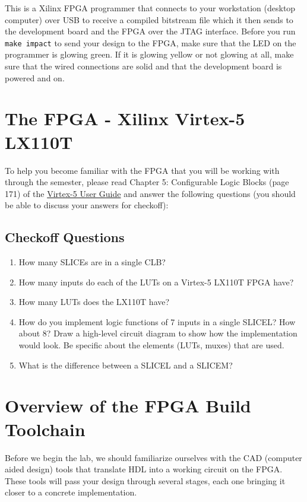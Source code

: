 \documentclass[11pt]{article}
\begin{document}
This is a Xilinx FPGA programmer that connects to your workstation (desktop computer) over USB to receive a compiled bitstream file which it then sends to the development board and the FPGA over the JTAG interface. Before you run \verb|make impact| to send your design to the FPGA, make sure that the LED on the programmer is glowing green. If it is glowing yellow or not glowing at all, make sure that the wired connections are solid and that the development board is powered and on.

\section{The FPGA - Xilinx Virtex-5 LX110T}
To help you become familiar with the FPGA that you will be working with through the semester, please read Chapter 5: Configurable Logic Blocks (page 171) of the \href{http://inst.eecs.berkeley.edu/~cs150/fa11/resources/ug190.pdf}{Virtex-5 User Guide} and answer the following questions (you should be able to discuss your answers for checkoff):

\subsection{Checkoff Questions}
\begin{enumerate}
	\item How many SLICEs are in a single CLB?
	\item How many inputs do each of the LUTs on a Virtex-5 LX110T FPGA have?
	\item How many LUTs does the LX110T have?
	\item How do you implement logic functions of 7 inputs in a single SLICEL? How about 8? Draw a high-level circuit diagram to show how the implementation would look. Be specific about the elements (LUTs, muxes) that are used.
	\item What is the difference between a SLICEL and a SLICEM?
\end{enumerate}

\section{Overview of the FPGA Build Toolchain}
Before we begin the lab, we should familiarize ourselves with the CAD (computer aided design) tools that translate HDL into a working circuit on the FPGA. These tools will pass your design through several stages, each one bringing it closer to a concrete implementation.\\
\end{document}
